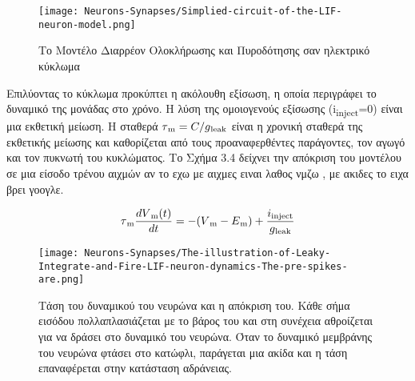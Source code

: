\documentclass[12pt]{report}
\begin{document}
\begin{figure}[htp]
    \centering
    \texttt{[image: Neurons-Synapses/Simplied-circuit-of-the-LIF-neuron-model.png]}
    \caption{Το Μοντέλο Διαρρέον Ολοκλήρωσης και Πυροδότησης σαν ηλεκτρικό κύκλωμα}
    \label{fig:lif-circuit}
\end{figure}

\vspace{5mm}

Επιλύοντας το κύκλωμα προκύπτει η ακόλουθη εξίσωση, η οποία περιγράφει το δυναμικό της μονάδας στο χρόνο. Η λύση της ομοιογενούς εξίσωσης \textlatin{(i\textsubscript{inject}=0)} είναι μια εκθετική μείωση. Η σταθερά \textlatin{\(\tau\textsubscript{m} = C/g\textsubscript{leak}\)} είναι η χρονική σταθερά της εκθετικής μείωσης και καθορίζεται από τους προαναφερθέντες παράγοντες, τον αγωγό και τον πυκνωτή του κυκλώματος. Το Σχήμα 3.4 δείχνει την απόκριση του μοντέλου σε μια είσοδο τρένου αιχμών αν το εχω με αιχμες ειναι λαθος νμζω , με ακιδες το ειχα βρει γοογλε.

\vspace{5mm}

\begin{equation}
\tau\textsubscript{m}\frac{dV\textsubscript{m}(t)}{dt}=-(V\textsubscript{m}-E\textsubscript{m})+\frac{i\textsubscript{inject}}{g\textsubscript{leak}}
\end{equation}

\vspace{5mm}

\begin{figure}[htp]
    \centering
    \texttt{[image: Neurons-Synapses/The-illustration-of-Leaky-Integrate-and-Fire-LIF-neuron-dynamics-The-pre-spikes-are.png]}
    \caption{Τάση του δυναμικού του νευρώνα και η απόκριση του. Κάθε σήμα εισόδου πολλαπλασιάζεται με το βάρος του και στη συνέχεια αθροίζεται για να δράσει στο δυναμικό του νευρώνα. Όταν το δυναμικό μεμβράνης του νευρώνα φτάσει στο κατώφλι, παράγεται μια ακίδα και η τάση επαναφέρεται στην κατάσταση αδράνειας.}
    \label{fig:lif-neuron}
\end{figure}

\medskip
\end{document}
